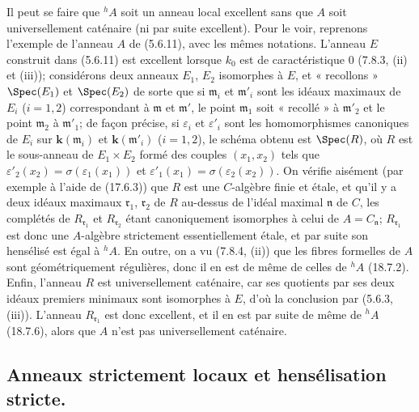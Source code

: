 \begin{remark}[18.7.7]
\label{IV.18.7.7}
Il peut se faire que ${}^h\!A$ soit un anneau local excellent sans que $A$ soit universellement caténaire (ni par suite excellent). Pour le voir, reprenons l'exemple de l'anneau $A$ de (5.6.11), avec les mêmes notations. L'anneau $E$ construit dans (5.6.11) est excellent lorsque $k_0$ est de caractéristique $0$ (7.8.3, (ii) et (iii)); considérons deux anneaux $E_1$, $E_2$ isomorphes à $E$, et « recollons » $\Spec(E_1)$ et $\Spec(E_2)$ de sorte que si $\mathfrak m_i$ et $\mathfrak m'_i$ sont les idéaux maximaux de $E_i$ ($i=1,2$) correspondant à $\mathfrak m$ et $\mathfrak m'$, le point $\mathfrak m_1$ soit « recollé » à $\mathfrak m'_2$ et le point $\mathfrak m_2$ à $\mathfrak m'_1$; de façon précise, si $\varepsilon_i$ et $\varepsilon'_i$ sont les homomorphismes canoniques de $E_i$ sur $\boldsymbol{k}(\mathfrak m_i)$ et $\boldsymbol{k}(\mathfrak m'_i)$ ($i=1,2$), le schéma obtenu est $\Spec(R)$, où $R$ est le sous-anneau de $E_1\times E_2$ formé des couples $(x_1,x_2)$ tels que $\varepsilon'_2(x_2)=\sigma(\varepsilon_1(x_1))$ et $\varepsilon'_1(x_1)=\sigma(\varepsilon_2(x_2))$. On vérifie aisément (par exemple à l'aide de (17.6.3)) que $R$ est une $C$-algèbre finie et étale, et qu'il y a deux idéaux maximaux $\mathfrak r_1$, $\mathfrak r_2$ de $R$ au-dessus de l'idéal maximal $\mathfrak n$ de $C$, les complétés de $R_{\mathfrak r_1}$ et $R_{\mathfrak r_2}$ étant canoniquement isomorphes à celui de $A=C_{\mathfrak n}$; $R_{\mathfrak r_1}$ est donc une $A$-algèbre strictement essentiellement étale, et par suite son hensélisé est égal à ${}^h\!A$. En outre, on a vu (7.8.4, (ii)) que les fibres formelles de $A$ sont géométriquement régulières, donc il en est de même de celles de ${}^h\!A$ (18.7.2). Enfin, l'anneau $R$ est universellement caténaire, car ses quotients par ses deux idéaux premiers minimaux sont isomorphes à $E$, d'où la conclusion par (5.6.3, (iii)). L'anneau $R_{\mathfrak r_1}$ est donc excellent, et il en est par suite de même de ${}^h\!A$ (18.7.6), alors que $A$ n'est pas universellement caténaire.
\end{remark}

\subsection{Anneaux strictement locaux et hensélisation stricte.}

